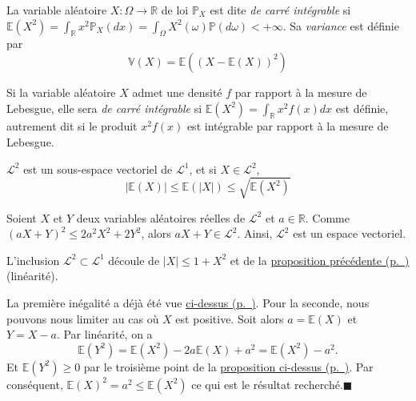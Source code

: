 \begin{definition}[{Variance}]\label{II-defvar}

La variable aléatoire \(X : \Omega \to \mathbb{R}\) de loi
\(\mathbb{P}_X\) est dite \emph{de carré intégrable} si
\(\mathbb{E}(X^2) = \int_{\mathbb{R}} x^2 \mathbb{P}_X(dx) = \int_{\Omega} X^2(\omega)\mathbb{P}(d\omega) < +\infty\).
Sa \emph{variance} est définie par
\[\mathbb{V}(X) = \mathbb{E}((X-\mathbb{E}(X))^2)\]

Si la variable aléatoire \(X\) admet une densité \(f\) par rapport à la
mesure de Lebesgue, elle sera \emph{de carré intégrable} si
\(\mathbb{E}(X^2) = \int_\mathbb{R}x^2 f(x)dx\) est définie, autrement
dit si le produit \(x^2 f(x)\) est intégrable par rapport à la mesure de
Lebesgue.
\end{definition}

\begin{proposition}[{Propriétés}]\label{II-propl2}

\(\mathcal{L}^2\) est un sous-espace vectoriel de \(\mathcal{L}^1\), et
si \(X \in \mathcal{L}^2\),
\[|\mathbb{E}(X)| \leq \mathbb{E}(|X|) \leq \sqrt{\mathbb{E}(X^2)}\]
\end{proposition}

\begin{preuve}
Soient \(X\) et \(Y\) deux variables aléatoires réelles de
\(\mathcal{L}^2\) et \(a \in \mathbb{R}\). Comme
\((aX+ Y)^2 \leq 2 a^2 X^2 + 2 Y^2\), alors
\(aX + Y \in \mathcal{L}^2\). Ainsi, \(\mathcal{L}^2\) est un espace
vectoriel.

L'inclusion \(\mathcal{L}^2 \subset \mathcal{L}^1\) découle de
\(|X| \leq 1 + X^2\) et de la \protect\hyperref[II-propl1]{proposition
précédente (p.~\pageref*{II-propl1})} (linéarité).

La première inégalité a déjà été vue
\protect\hyperref[II-propl1]{ci-dessus (p.~\pageref*{II-propl1})}. Pour
la seconde, nous pouvons nous limiter au cas où \(X\) est positive. Soit
alors \(a = \mathbb{E}(X)\) et \(Y = X-a\). Par linéarité, on a
\[ \mathbb{E}(Y^2) = \mathbb{E}(X^2) - 2a \mathbb{E}(X) + a^2 = \mathbb{E}(X^2)-a^2.\]
Et \(\mathbb{E}(Y^2) \geq 0\) par le troisième point de la
\protect\hyperref[II-propl1]{proposition
ci-dessus (p.~\pageref*{II-propl1})}. Par conséquent,
\(\mathbb{E}(X)^2 = a^2 \leq \mathbb{E}(X^2)\) ce qui est le résultat
recherché.\hfill$\blacksquare$
\end{preuve}


